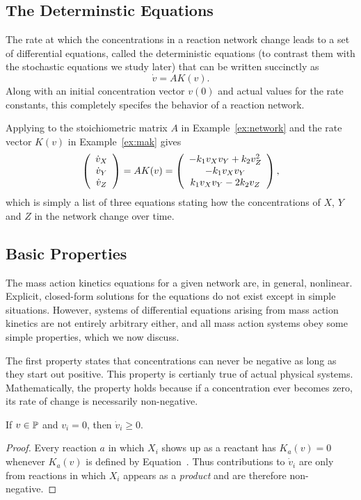 \subsection{The Determinstic Equations}

The rate at which the concentrations in a reaction network change
leads to a set of differential equations, called the deterministic
equations (to contrast them with the stochastic equations we study
later) that can be written succinctly as
%
\begin{equation} \label{eqn:mak}
\dot v = A K(v) .
\end{equation}
%
Along with an initial concentration vector $v(0)$ and actual values
for the rate constants, this completely specifes the behavior of a
reaction network.

\begin{example} Applying   to the stoichiometric matrix $A$ in
  Example~\ref{ex:network} and the rate vector $K(v)$ in
  Example~\ref{ex:mak} gives
%
$$
\left ( \begin{array}{c} \dot v_X \\ \dot v_Y \\ \dot v_Z \end{array} \right ) = A K(v) 
  = \left ( \begin{array}{c} -k_1 v_X v_Y + k_2 v_Z^2 \\ -k_1 v_X v_Y \\ k_1 v_X v_Y - 2 k_2 v_Z \end{array} \right ) ,
$$
%
which is simply a list of three equations stating how the
concentrations of $X$, $Y$ and $Z$ in the network change over time. \enx
\end{example}

\subsection{Basic Properties}

The mass action kinetics equations for a given network are, in
general, nonlinear. Explicit, closed-form solutions for the equations
do not exist except in simple situations. However, systems of
differential equations arising from mass action kinetics are not
entirely arbitrary either, and all mass action systems obey some
simple properties, which we now discuss.

The first property states that concentrations can never be negative as
long as they start out positive. This property is certianly true of
actual physical systems. Mathematically, the property holds because if
a concentration ever becomes zero, its rate of change is necessarily
non-negative.

\begin{property} \label{prop:nonneg} If $v \in \mathbb{P}$ and
  $v_i=0$, then $\dot v_i \geq 0$.
\end{property}

\begin{proof}
  Every reaction $a$ in which $X_i$ shows up as a reactant has $K_a(v)=0$
  whenever $K_a(v)$ is defined by Equation~. Thus 
  contributions to $\dot v_i$ are only from reactions in which $X_i$
  appears as a {\em product} and are therefore non-negative. 
\end{proof}

